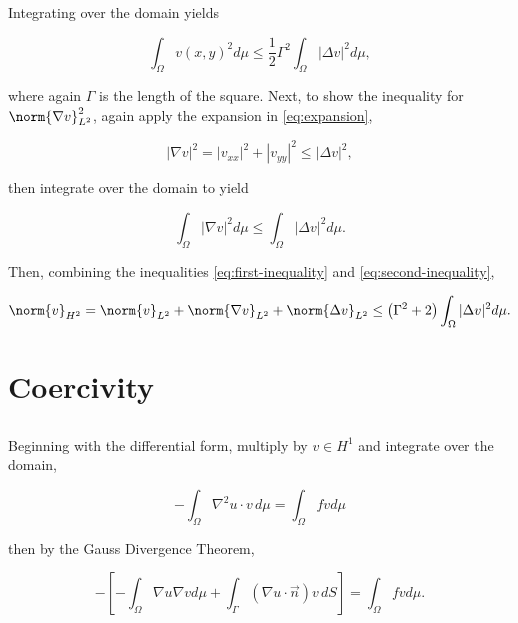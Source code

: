 \documentclass{hw-template}
\newcommand{\intOm}{\int_{\Omega}}
\newcommand{\hOne}{{H^1}}
\newcommand{\ltwo}{{L^2}}
\newcommand{\htwo}{{H^2}}
\begin{document}
Integrating over the domain yields

\begin{equation}
    \intOm v(x, y)^2 d \mu \leq \frac{1}{2} \Gamma^2\intOm |\Delta v|^2 d\mu,\label{eq:first-inequality}
\end{equation}

where again $\Gamma$ is the length of the square. Next, to show the inequality for $\norm{\nabla v}_\ltwo^2$, again apply the expansion in \autoref{eq:expansion},

\begin{equation}
   |\nabla v|^2 = |v_{xx}|^2 + |v_{yy}|^2 \leq |\Delta v|^2,
\end{equation}

then integrate over the domain to yield

\begin{equation}
    \intOm |\nabla v|^2  d\mu \leq \intOm |\Delta v|^2  d\mu.\label{eq:second-inequality}
\end{equation}

Then, combining the inequalities \autoref{eq:first-inequality} and \autoref{eq:second-inequality},

\begin{equation}
    \norm{v}_\htwo = \norm{v}_\ltwo + \norm{\nabla v}_\ltwo + \norm{\Delta v}_\ltwo \leq \left(\Gamma^2 + 2 \right) \intOm |\Delta v|^2  d\mu.
\end{equation}

\section{Coercivity}

\subsection{}

Beginning with the differential form, multiply by $v \in \hOne$ and integrate over the domain,

\begin{equation}
    - \intOm \nabla^2 u \cdot v\, d\mu = \intOm fv d\mu
\end{equation}

then by the Gauss Divergence Theorem,

\begin{equation}
    - \left[-\intOm \nabla u \nabla v d\mu + \int_{\Gamma} (\nabla u \cdot \vec{n})v\, dS \right] = \intOm fv d\mu.
\end{equation}
\end{document}
